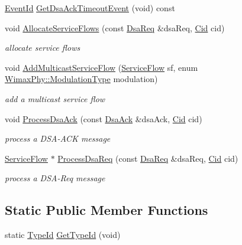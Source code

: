 \begin{DoxyCompactItemize}
\hyperlink{classns3_1_1EventId}{Event\+Id} \hyperlink{classns3_1_1BsServiceFlowManager_ae88420e41d1b90f34fefee9f6a5b4c4c}{Get\+Dsa\+Ack\+Timeout\+Event} (void) const 
\item 
void \hyperlink{classns3_1_1BsServiceFlowManager_a2c9d6e3696af0e9bc15bcbe4089ab489}{Allocate\+Service\+Flows} (const \hyperlink{classns3_1_1DsaReq}{Dsa\+Req} \&dsa\+Req, \hyperlink{classns3_1_1Cid}{Cid} cid)
\begin{DoxyCompactList}\small\item\em allocate service flows \end{DoxyCompactList}\item 
void \hyperlink{classns3_1_1BsServiceFlowManager_a608f17a9cc0c559ed3f47c8947c95659}{Add\+Multicast\+Service\+Flow} (\hyperlink{classns3_1_1ServiceFlow}{Service\+Flow} sf, enum \hyperlink{classns3_1_1WimaxPhy_a044c5d8a48ca992c39c2a946f6e755fa}{Wimax\+Phy\+::\+Modulation\+Type} modulation)
\begin{DoxyCompactList}\small\item\em add a multicast service flow \end{DoxyCompactList}\item 
void \hyperlink{classns3_1_1BsServiceFlowManager_a8a3d973a3b22ebc565f65c61fc9a56f1}{Process\+Dsa\+Ack} (const \hyperlink{classns3_1_1DsaAck}{Dsa\+Ack} \&dsa\+Ack, \hyperlink{classns3_1_1Cid}{Cid} cid)
\begin{DoxyCompactList}\small\item\em process a D\+S\+A-\/\+A\+CK message \end{DoxyCompactList}\item 
\hyperlink{classns3_1_1ServiceFlow}{Service\+Flow} $\ast$ \hyperlink{classns3_1_1BsServiceFlowManager_afba823b624d516de570c0c7a6312de2b}{Process\+Dsa\+Req} (const \hyperlink{classns3_1_1DsaReq}{Dsa\+Req} \&dsa\+Req, \hyperlink{classns3_1_1Cid}{Cid} cid)
\begin{DoxyCompactList}\small\item\em process a D\+S\+A-\/\+Req message \end{DoxyCompactList}\end{DoxyCompactItemize}
\subsection*{Static Public Member Functions}
\begin{DoxyCompactItemize}
\item 
static \hyperlink{classns3_1_1TypeId}{Type\+Id} \hyperlink{classns3_1_1BsServiceFlowManager_ae13d0dff1473149c3daec527c08103a9}{Get\+Type\+Id} (void)
\end{DoxyCompactItemize}
